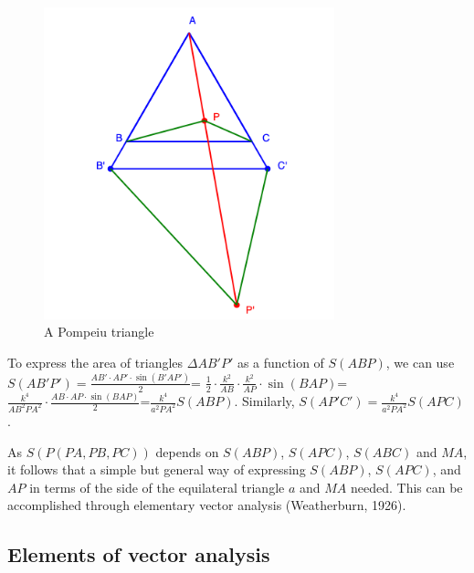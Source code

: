 \documentclass[12pt]{article}
\begin{document}
\begin{figure}[h]
\centering
\includegraphics[width=0.75\textwidth]{pompeiuTriangle.png}
\caption{A Pompeiu triangle}
\label{fig:pompeiuTriangles1}
\end{figure}

To express the area of triangles $\Delta AB'P'$ as a function of $S(ABP)$, we can use $S(AB'P')=\frac {AB'\cdot AP' \cdot \sin(B'AP')}{2}$=
$\frac{1}{2} \cdot \frac {k^2} {AB} \cdot \frac {k^2}{AP} \cdot \sin(BAP)$=$\frac {k^4} {AB^2 PA^2} \cdot \frac {AB \cdot AP \cdot \sin(BAP)} {2}$=$\frac {k^4}{a^2 PA^2} S(ABP)$. Similarly, $S(AP'C')=\frac {k^4}{a^2 PA^2} S(APC)$. 

As $S(P(PA,PB,PC))$ depends on $S(ABP)$, $S(APC)$, $S(ABC)$ and $MA$, it follows that a simple but general way of expressing $S(ABP)$, $S(APC)$, and $AP$ in terms of the side of the equilateral triangle $a$ and $MA$ needed.  This can be accomplished through elementary vector analysis (Weatherburn, 1926).

\subsection{Elements of vector analysis}
\end{document}
